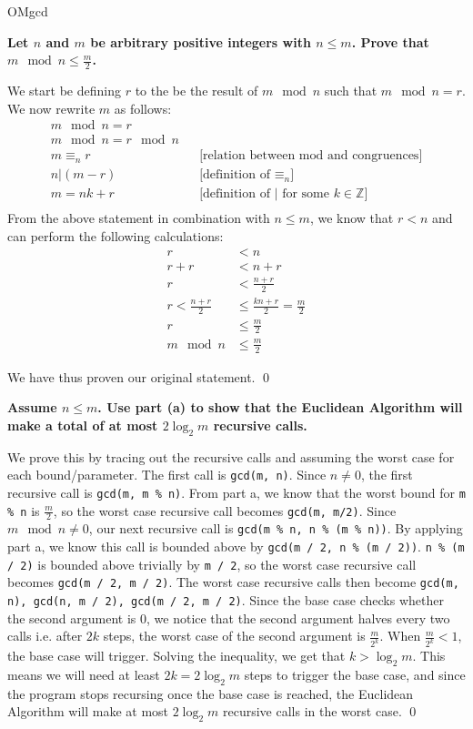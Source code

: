 \documentclass[11pt, nopagenumbers]{adamblan-hw}
\begin{document}
\begin{question}{OMgcd}
\begin{part}
\textbf{Let $n$ and $m$ be arbitrary positive integers with $n \leq m$. Prove that $m \mod n \leq \frac{m}{2}$.}

We start be defining $r$ to the be the result of $m \mod n$ such that $m \mod n = r$. We now rewrite $m$ as follows:
\begin{align*}
m \mod n = r \\
m \mod n = r \mod n \\
m \equiv_n r && \text{[relation between mod and congruences]}\\
n | (m - r) && \text{[definition of $\equiv_n$]} \\
m = nk + r && \text{[definition of | for some $k \in \mathbb{Z}$]} \\
\end{align*} 
From the above statement in combination with $n \leq m$, we know that $r < n$ and can perform the following calculations:
\begin{align*}
r &< n \\
r + r &< n + r \\
r &< \frac{n + r}{2} \\
r < \frac{n + r}{2} &\leq \frac{kn + r}{2} = \frac{m}{2} \\
r &\leq \frac{m}{2} \\
m \mod n &\leq \frac{m}{2}
\end{align*}

We have thus proven our original statement.
\qed
\end{part}

\begin{part}
\textbf{Assume $n \leq m$. Use part (a) to show that the Euclidean Algorithm will make a total of at most $2 \log_2 m$
recursive calls.}

We prove this by tracing out the recursive calls and assuming the worst case for each bound/parameter. The first call is 
\texttt{gcd(m, n)}. Since $n \neq 0$, the first recursive call is \texttt{gcd(m, m \% n)}. From part a, we know that the worst bound 
for \texttt{m \% n} is $\frac{m}{2}$, so the worst case recursive call becomes \texttt{gcd(m, m/2)}. Since $m \mod n \neq 0$, our next recursive call
is \texttt{gcd(m \% n, n \% (m \% n))}. By applying part a, we know this call is bounded above by \texttt{gcd(m / 2, n \% (m / 2))}. \texttt{n \% (m / 2)} is
bounded above trivially by \texttt{m / 2}, so the worst case recursive call becomes \texttt{gcd(m / 2, m / 2)}. The worst case recursive calls then become 
\texttt{gcd(m, n), gcd(n, m / 2), gcd(m / 2, m / 2)}. Since the base case checks whether the second argument is 0, we notice that the second argument halves
every two calls i.e. after $2k$ steps, the worst case of the second argument is $\frac{m}{2^k}$. When $\frac{m}{2^k} < 1$, the base case will
trigger. Solving the inequality, we get that $k > \log_2 m$. This means we will need at least $2k = 2 \log_2 m$ steps to trigger the base case, and since the program
stops recursing once the base case is reached, the Euclidean Algorithm will make at most $2 \log_2 m$ recursive calls in the worst case. \qed
\end{part}
\end{question}
\end{document}
